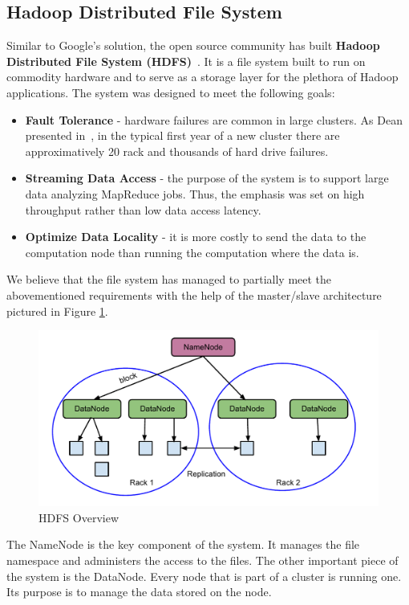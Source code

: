 \documentclass[11pt,a4paper,twoside]{report}
\begin{document}
\subsection{Hadoop Distributed File System}
Similar to Google's solution, the open source community has built \textbf{Hadoop Distributed File System (HDFS)}~\cite{HDFS}. It is a file system built to run on commodity hardware and to serve as a storage layer for the plethora of Hadoop applications. The system was designed to meet the following goals:

\begin{itemize}
\item{}
\textbf{Fault Tolerance}
- hardware failures are common in large clusters. As Dean presented in~\cite{ClusterFailure}, in the typical first year of a new cluster there are approximatively 20 rack and thousands of hard drive failures.
\item{}
\textbf{Streaming Data Access}
- the purpose of the system is to support large data analyzing MapReduce jobs. Thus, the emphasis was set on high throughput rather than low data access latency.
\item{}
\textbf{Optimize Data Locality}
- it is more costly to send the data to the computation node than running the computation where the data is.
\end{itemize}


We believe that the file system has managed to partially meet the abovementioned requirements with the help of the master/slave architecture pictured in Figure \ref{fig:HDFS}.

\begin{figure}[h]
\centering
\includegraphics[scale=0.77]{HDFS}
\caption{HDFS Overview}
\label{fig:HDFS}
\end{figure}


The NameNode is the key component of the system. It manages the file namespace and administers the access to the files. The other important piece of the system is the DataNode. Every node that is part of a cluster is running one. Its purpose is to manage the data stored on the node.
\end{document}
